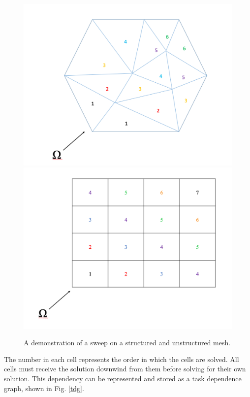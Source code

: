 \documentclass{anstrans}
\begin{document}
\begin{figure}
\centering
\includegraphics[scale = 0.27]{figures/UnstructureMesh.pdf}
\includegraphics[scale = 0.27]{figures/StructuredMesh.pdf}
\caption{A demonstration of a sweep on a structured and unstructured mesh. }
\label{sweeps}
\end{figure}

The number in each cell represents the order in which the cells are solved. All cells must receive the solution downwind from them before solving for their own solution. This dependency can be represented and stored as a task dependence graph, shown in Fig. \ref{tdg}.
\end{document}
